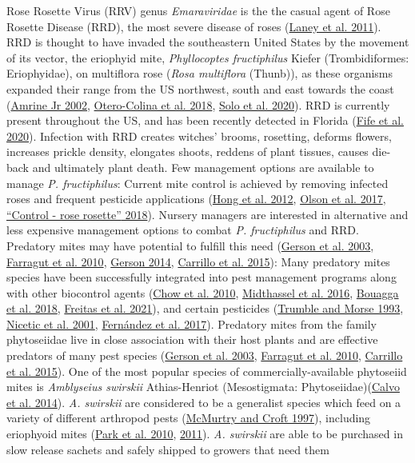 \documentclass{ufdissertation}[overrideChapters] %
\begin{document}
{Rose Rosette Virus (RRV) genus \emph{Emaraviridae} is the the casual agent of Rose Rosette Disease (RRD), the most severe disease of roses (\protect\hyperlink{ref-Laney2011}{Laney et al. 2011}). RRD is thought to have invaded the southeastern United States by the movement of its vector, the eriophyid mite, \emph{Phyllocoptes fructiphilus} Kiefer (Trombidiformes: Eriophyidae), on multiflora rose (\emph{Rosa multiflora} (Thunb)), as these organisms expanded their range from the US northwest, south and east towards the coast (\protect\hyperlink{ref-Amrine2002}{Amrine Jr 2002}, \protect\hyperlink{ref-Otero-Colina2018}{Otero-Colina et al. 2018}, \protect\hyperlink{ref-Solo2020}{Solo et al. 2020}). RRD is currently present throughout the US, and has been recently detected in Florida (\protect\hyperlink{ref-Fife2020}{Fife et al. 2020}). Infection with RRD creates witches' brooms, rosetting, deforms flowers, increases prickle density, elongates shoots, reddens of plant tissues, causes die-back and ultimately plant death. Few management options are available to manage \emph{P. fructiphilus}: Current mite control is achieved by removing infected roses and frequent pesticide applications (\protect\hyperlink{ref-Hong2012}{Hong et al. 2012}, \protect\hyperlink{ref-Olson2017}{Olson et al. 2017}, \protect\hyperlink{ref-UGA2018}{{``Control - rose rosette''} 2018}). Nursery managers are interested in alternative and less expensive management options to combat \emph{P. fructiphilus} and RRD. Predatory mites may have potential to fulfill this need (\protect\hyperlink{ref-Gerson2003}{Gerson et al. 2003}, \protect\hyperlink{ref-Farragut2010}{Farragut et al. 2010}, \protect\hyperlink{ref-Gerson2014}{Gerson 2014}, \protect\hyperlink{ref-Carrillo2015}{Carrillo et al. 2015}): Many predatory mites species have been successfully integrated into pest management programs along with other biocontrol agents (\protect\hyperlink{ref-Chow2010}{Chow et al. 2010}, \protect\hyperlink{ref-Midthassel2016}{Midthassel et al. 2016}, \protect\hyperlink{ref-Bouagga2018}{Bouagga et al. 2018}, \protect\hyperlink{ref-Freitas2021}{Freitas et al. 2021}), and certain pesticides (\protect\hyperlink{ref-Trumble1993}{Trumble and Morse 1993}, \protect\hyperlink{ref-Nicetic2001}{Nicetic et al. 2001}, \protect\hyperlink{ref-Fernandez2017}{Fernández et al. 2017}). Predatory mites from the family phytoseiidae live in close association with their host plants and are effective predators of many pest species (\protect\hyperlink{ref-Gerson2003}{Gerson et al. 2003}, \protect\hyperlink{ref-Farragut2010}{Farragut et al. 2010}, \protect\hyperlink{ref-Carrillo2015}{Carrillo et al. 2015}). One of the most popular species of commercially-available phytoseiid mites is \emph{Amblyseius swirskii} Athias-Henriot (Mesostigmata: Phytoseiidae)(\protect\hyperlink{ref-Calvo2014}{Calvo et al. 2014}). \emph{A. swirskii} are considered to be a generalist species which feed on a variety of different arthropod pests (\protect\hyperlink{ref-McMurtry1997}{McMurtry and Croft 1997}), including eriophyoid mites (\protect\hyperlink{ref-Park2010}{Park et al. 2010}, \protect\hyperlink{ref-Park2011}{2011}). \emph{A. swirskii} are able to be purchased in slow release sachets and safely shipped to growers that need them }
\end{document}
